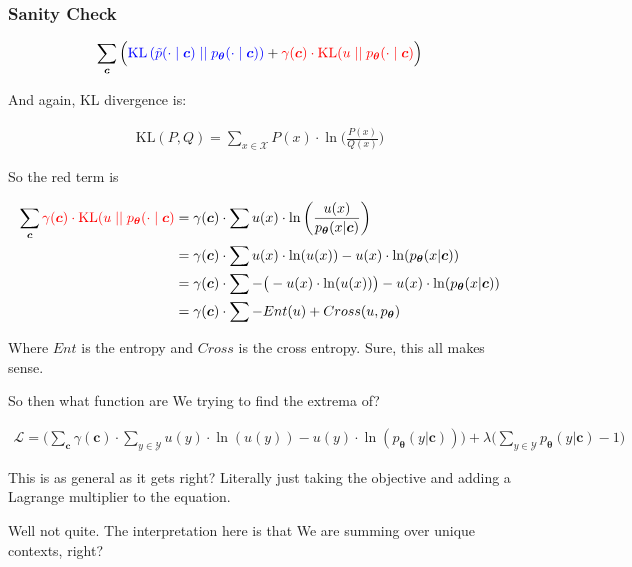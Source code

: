 \documentclass{article}
\newcommand{\KL}{\mathrm{KL}}
\newcommand{\uniform}{u}
\newcommand{\vtheta}{\boldsymbol{\theta}}
\newcommand{\model}{p_{\vtheta}}
\newcommand{\context}{\boldsymbol{c}}
\begin{document}
		\subsubsection{Sanity Check}
		
			\begin{align}
		  		 \sum_{\context} \Big( {\color{blue} \KL\left(\tilde{p}(\cdot 			\mid \context) \mid\mid \model(\cdot \mid \context)					\right)} + {\color{red}\gamma(\context) \cdot 						\KL(\uniform \mid\mid \model(\cdot \mid \context)}\Big)
			\end{align}
			
			And again, KL divergence is:
			
			\begin{align}
				\KL(P, Q) = \sum_{x\in\mathcal{X}} P(x)\cdot \ln\bigg(\frac{P(x)}{Q(x)}\bigg)
			\end{align}
		
			So the red term is
			
			\begin{align}
				\sum_{\context} {\color{red}\gamma(\context) \cdot 						\KL(\uniform \mid\mid \model(\cdot \mid \context)} &= \gamma(\context)\cdot\sum u(x)\cdot \ln\bigg(\frac{u(x)}{\model(x|\context)}\bigg)\\
			&= \gamma(\context)\cdot\sum u(x)\cdot\ln(u(x)) - u(x)\cdot\ln(\model(x|\context))\\
				&= \gamma(\context)\cdot\sum -\big(-u(x)\cdot\ln(u(x))\big) - u(x)\cdot\ln(\model(x|\context))\\
				&= \gamma(\context)\cdot\sum -Ent(u) + Cross(u, \model)
			\end{align}
			
			Where $Ent$ is the entropy and $Cross$ is the cross entropy. Sure, this all makes sense. 
			
			So then what function are We trying to find the extrema of? 
			
			\begin{align}
				\mathcal{L} = \bigg(\sum_{\context} \gamma(\context)\cdot\sum_{y\in\mathcal{Y}} u(y)\cdot\ln(u(y)) - u(y)\cdot\ln(\model(y|\context))\bigg) + \lambda\bigg(\sum_{y\in\mathcal{Y}} \model(y|\context) -1 \bigg)
			\end{align}
			
			This is as general as it gets right? Literally just taking the objective and adding a Lagrange multiplier to the equation. 

			Well not quite. The interpretation here is that We are summing over unique contexts, right?
			
\end{document}
